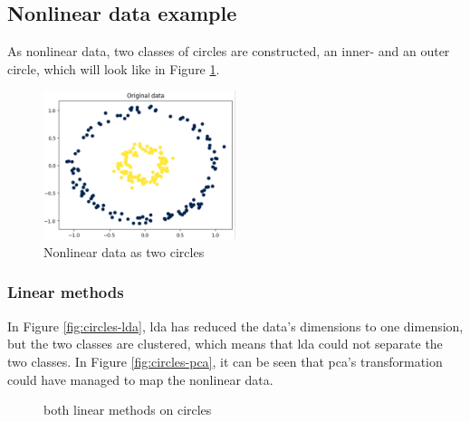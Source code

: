 \subsection{Nonlinear data example}\label{subsec:nonlinear-data-example}
As nonlinear data, two classes of circles are constructed, an inner- and an outer circle, which will look like in Figure \ref{fig:circles}.

\begin{figure}[htb!]
    \centering
    \includegraphics[width=0.5\textwidth]{figures/theory-example-figures/fig-circles.png}
    \caption{Nonlinear data as two circles}
    \label{fig:circles}
\end{figure}

\subsubsection{Linear methods}\label{subsubsec:linear-methods-on-circles}
In Figure \ref{fig:circles-lda}, \gls{lda} has reduced the data's dimensions to one dimension, but the two classes are clustered, which means that \gls{lda} could not separate the two classes. In Figure \ref{fig:circles-pca}, it can be seen that \gls{pca}'s transformation could have managed to map the nonlinear data.

\begin{figure}[htb!]
    \centering
    \qquad
    \caption{both linear methods on circles}
    \label{fig:linear-methods-circles}
\end{figure}

